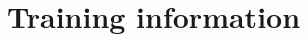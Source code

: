 \documentclass[pmlr]{jmlr}%
\begin{document}
\section{Training information} \label{ap:training_curves}








\end{document}
